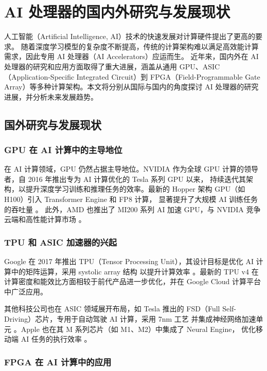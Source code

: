 \section{AI 处理器的国内外研究与发展现状}

人工智能（Artificial Intelligence, AI）技术的快速发展对计算硬件提出了更高的要求。
随着深度学习模型的复杂度不断提高，传统的计算架构难以满足高效能计算需求，因此专用 AI 处理器（AI Accelerators）应运而生。
近年来，国内外在 AI 处理器的研究和应用方面取得了重大进展\cite{yishouyi}，涵盖从通用 GPU、ASIC（Application-Specific Integrated Circuit）到 FPGA（Field-Programmable Gate Array）等多种计算架构。本文将分别从国际与国内的角度探讨 AI 处理器的研究进展，并分析未来发展趋势。

\subsection{国外研究与发展现状}

\subsubsection{GPU 在 AI 计算中的主导地位}

在 AI 计算领域，GPU 仍然占据主导地位。NVIDIA 作为全球 GPU 计算的领导者，自 2016 年推出专为 AI 计算优化的 Tesla 系列 GPU 以来，
持续迭代其架构，以提升深度学习训练和推理任务的效率。最新的 Hopper 架构 GPU（如 H100）引入 Transformer Engine 和 FP8 计算，
显著提升了大规模 AI 训练任务的吞吐量 \cite{choquette2023nvidia}。
此外，AMD 也推出了 MI200 系列 AI 加速 GPU，与 NVIDIA 竞争云端和高性能计算市场 \cite{smith2022amd}。

\subsubsection{TPU 和 ASIC 加速器的兴起}

Google 在 2017 年推出 TPU（Tensor Processing Unit），其设计目标是优化 AI 计算中的矩阵运算，采用 systolic array 结构
以提升计算效率 \cite{jouppi2017datacenter}。最新的 TPU v4 在计算密度和能效比方面相较于前代产品进一步优化，并在 Google Cloud 计算平台中广泛应用。

其他科技公司也在 ASIC 领域展开布局，如 Tesla 推出的 FSD（Full Self-Driving）芯片，专用于自动驾驶 AI 计算，采用 7nm 工艺
并集成神经网络加速单元 \cite{talpes2020compute}。Apple 也在其 M 系列芯片（如 M1、M2）中集成了 Neural Engine，
优化移动端 AI 任务的执行效率 \cite{kasperek2022comparison}。

\subsubsection{FPGA 在 AI 计算中的应用}

